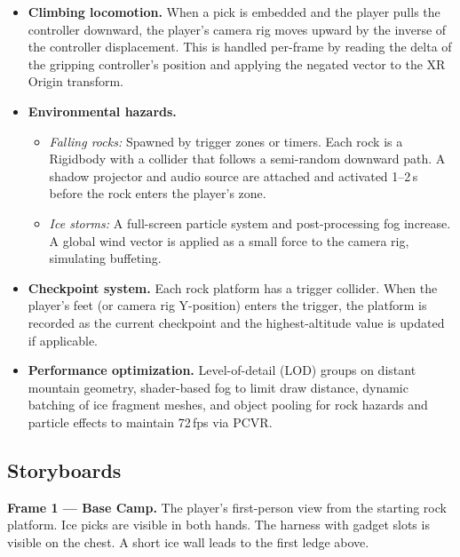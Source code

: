 \documentclass[12pt]{article}
\begin{document}
\begin{itemize}[leftmargin=2em]
    \item \textbf{Climbing locomotion.} When a pick is embedded and the player pulls the controller downward, the player's camera rig moves upward by the inverse of the controller displacement. This is handled per-frame by reading the delta of the gripping controller's position and applying the negated vector to the XR Origin transform.

    \item \textbf{Environmental hazards.}
    \begin{itemize}
        \item \emph{Falling rocks:} Spawned by trigger zones or timers. Each rock is a Rigidbody with a collider that follows a semi-random downward path. A shadow projector and audio source are attached and activated 1--2\,s before the rock enters the player's zone.
        \item \emph{Ice storms:} A full-screen particle system and post-processing fog increase. A global wind vector is applied as a small force to the camera rig, simulating buffeting.
    \end{itemize}

    \item \textbf{Checkpoint system.} Each rock platform has a trigger collider. When the player's feet (or camera rig Y-position) enters the trigger, the platform is recorded as the current checkpoint and the highest-altitude value is updated if applicable.

    \item \textbf{Performance optimization.} Level-of-detail (LOD) groups on distant mountain geometry, shader-based fog to limit draw distance, dynamic batching of ice fragment meshes, and object pooling for rock hazards and particle effects to maintain 72\,fps via PCVR.
\end{itemize}

\subsection{Storyboards}


\textbf{Frame 1 --- Base Camp.} The player's first-person view from the starting rock platform. Ice picks are visible in both hands. The harness with gadget slots is visible on the chest. A short ice wall leads to the first ledge above.
\end{document}
